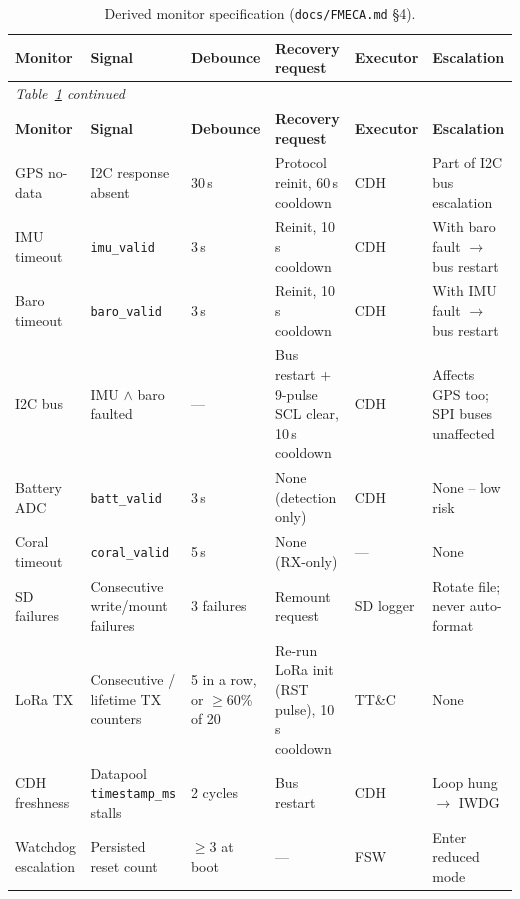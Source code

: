 \small
\begin{longtable}{p{1.7cm}p{2.0cm}p{1.7cm}p{2.4cm}p{2.4cm}p{2.4cm}}
\caption{Derived monitor specification (\texttt{docs/FMECA.md} \S4).}
\label{tab:fsw-fmeca-monitors}\\
\toprule
\textbf{Monitor} & \textbf{Signal} & \textbf{Debounce} & \textbf{Recovery request} & \textbf{Executor} & \textbf{Escalation} \\
\midrule
\endfirsthead
\multicolumn{6}{l}{\small\itshape Table~\ref{tab:fsw-fmeca-monitors} continued}\\
\toprule
\textbf{Monitor} & \textbf{Signal} & \textbf{Debounce} & \textbf{Recovery request} & \textbf{Executor} & \textbf{Escalation} \\
\midrule
\endhead
GPS no-data & I2C response absent & 30\,s & Protocol reinit, 60\,s cooldown & CDH & Part of I2C bus escalation \\
IMU timeout & \texttt{imu\_valid} & 3\,s & Reinit, 10\,s cooldown & CDH & With baro fault $\to$ bus restart \\
Baro timeout & \texttt{baro\_valid} & 3\,s & Reinit, 10\,s cooldown & CDH & With IMU fault $\to$ bus restart \\
I2C bus & IMU $\wedge$ baro faulted & --- & Bus restart + 9-pulse SCL clear, 10\,s cooldown & CDH & Affects GPS too; SPI buses unaffected \\
Battery ADC & \texttt{batt\_valid} & 3\,s & None (detection only) & CDH & None -- low risk \\
Coral timeout & \texttt{coral\_valid} & 5\,s & None (RX-only) & --- & None \\
SD failures & Consecutive write/mount failures & 3 failures & Remount request & SD logger & Rotate file; never auto-format \\
LoRa TX & Consecutive / lifetime TX counters & 5 in a row, or $\geq$60\% of 20 & Re-run LoRa init (RST pulse), 10\,s cooldown & TT\&C & None \\
CDH freshness & Datapool \texttt{timestamp\_ms} stalls & 2 cycles & Bus restart & CDH & Loop hung $\to$ IWDG \\
Watchdog escalation & Persisted reset count & $\geq$3 at boot & --- & FSW & Enter reduced mode \\
\bottomrule
\end{longtable}
